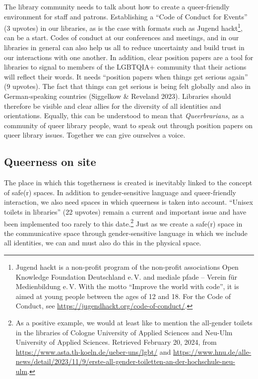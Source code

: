 \documentclass[a4paper,
fontsize=11pt,
oneside,
numbers=noperiodatend,
parskip=half-,
bibliography=totoc,
final
]{scrartcl}
\begin{document}
The library community needs to talk about how to create a queer-friendly
environment for staff and patrons. Establishing a \enquote{Code of Conduct for
Events} (3 upvotes) in our libraries, as is the case with formats such
as Jugend hackt\footnote{Jugend hackt is a non-profit program of the
  non-profit associations Open Knowledge Foundation Deutschland e.\,V. and
  mediale pfade -- Verein für Medienbildung e.\,V. With the motto \enquote{Improve
  the world with code}, it is aimed at young people between the ages of
  12 and 18. For the Code of Conduct, see
  \url{https://jugendhackt.org/code-of-conduct/}.}, can be a start.
Codes of conduct at our conferences and meetings, and in our libraries
in general can also help us all to reduce uncertainty and build trust in
our interactions with one another. In addition, clear position papers
are a tool for libraries to signal to members of the LGBTQIA+ community
that their actions will reflect their words. It needs \enquote{position papers
when things get serious again} (9 upvotes). The fact that things can get
serious is being felt globally and also in German-speaking countries
(Siggelkow \& Reveland 2023). Libraries should therefore be visible and
clear allies for the diversity of all identities and orientations.
Equally, this can be understood to mean that \emph{Queerbrarians}, as a
community of queer library people, want to speak out through position
papers on queer library issues. Together we can give ourselves a voice.

\hypertarget{queerness-on-site}{%
\subsection{Queerness on site}\label{queerness-on-site}}

The place in which this togetherness is created is inevitably linked to
the concept of safe(r) spaces. In addition to gender-sensitive language
and queer-friendly interaction, we also need spaces in which queerness
is taken into account. \enquote{Unisex toilets in libraries} (22 upvotes) remain
a current and important issue and have been implemented too rarely to
this date.\footnote{As a positive example, we would at least like to
  mention the all-gender toilets in the libraries of Cologne University
  of Applied Sciences and Neu-Ulm University of Applied Sciences.
  Retrieved February 20, 2024, from
  \url{https://www.asta.th-koeln.de/ueber-uns/lgbt/} and
  \url{https://www.hnu.de/alle-news/detail/2023/11/9/erste-all-gender-toiletten-an-der-hochschule-neu-ulm}.}
Just as we create a safe(r) space in the communicative space through
gender-sensitive language in which we include all identities, we can and
must also do this in the physical space.
\end{document}
